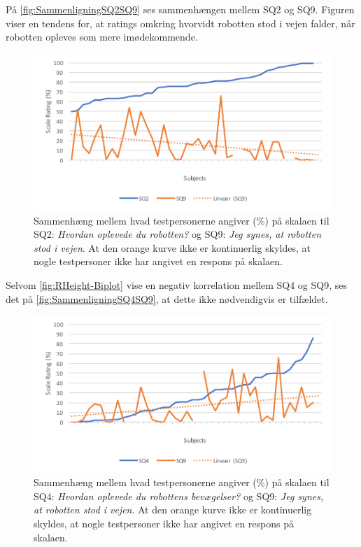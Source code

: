 \noindent
%
På \autoref{fig:SammenligningSQ2SQ9} ses sammenhængen mellem SQ2 og SQ9. Figuren viser en tendens for, at ratings omkring hvorvidt robotten stod i vejen falder, når robotten opleves som mere imødekommende.
%
\begin{figure}[H]
	\centering
	\includegraphics[width=\textwidth]{Figure/Korrelationsgrafer/SQ2+SQ9}
	\caption{Sammenhæng mellem hvad testpersonerne angiver (\%) på skalaen til SQ2: \textit{Hvordan oplevede du robotten?} og SQ9: \textit{Jeg synes, at robotten stod i vejen}. At den orange kurve ikke er kontinuerlig skyldes, at nogle testpersoner ikke har angivet en respons på skalaen.}
	\label{fig:SammenligningSQ2SQ9}
\end{figure}
\noindent
%
Selvom \autoref{fig:RHeight-Biplot} vise en negativ korrelation mellem SQ4 og SQ9, ses det på \autoref{fig:SammenligningSQ4SQ9}, at dette ikke nødvendigvis er tilfældet.
%
\begin{figure}[H]
	\centering
	\includegraphics[width=\textwidth]{Figure/Korrelationsgrafer/SQ4+SQ9}
	\caption{Sammenhæng mellem hvad testpersonerne angiver (\%) på skalaen til SQ4: \textit{Hvordan oplevede du robottens bevægelser?} og SQ9: \textit{Jeg synes, at robotten stod i vejen}. At den orange kurve ikke er kontinuerlig skyldes, at nogle testpersoner ikke har angivet en respons på skalaen.}
	\label{fig:SammenligningSQ4SQ9}
\end{figure}
